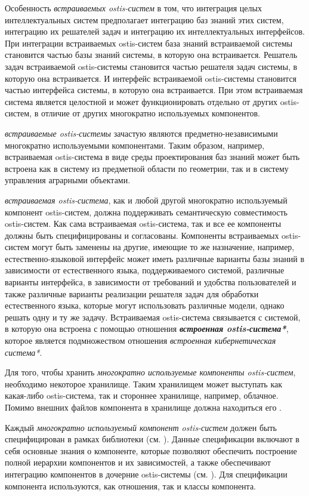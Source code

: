 Особенность \textit{встраиваемых ostis-систем} в том, что интеграция целых интеллектуальных систем предполагает интеграцию баз знаний этих систем, интеграцию их решателей задач и интеграцию их интеллектуальных интерфейсов. При интеграции встраиваемых ostis-систем база знаний встраиваемой системы становится частью базы знаний системы, в которую она встраивается. Решатель задач встраиваемой ostis-системы становится частью решателя задач системы, в которую она встраивается. И интерфейс встраиваемой ostis-системы становится частью интерфейса системы, в которую она встраивается. При этом встраиваемая система является целостной и может функционировать отдельно от других ostis-систем, в отличие от других многократно используемых компонентов.

\textit{встраиваемые ostis-системы} зачастую являются предметно-независимыми многократно используемыми компонентами. Таким образом, например, встраиваемая ostis-система в виде среды проектирования баз знаний может быть встроена как в систему из предметной области по геометрии, так и в систему управления аграрными объектами.

\textit{встраиваемая ostis-система}, как и любой другой многократно используемый компонент ostis-систем, должна поддерживать семантическую совместимость ostis-систем. Как сама встраиваемая ostis-система, так и все ее компоненты должны быть специфицированы и согласованы. Компоненты встраиваемых ostis-систем могут быть заменены на другие, имеющие то же назначение, например, естественно-языковой интерфейс может иметь различные варианты базы знаний в зависимости от естественного языка, поддерживаемого системой, различные варианты интерфейса, в зависимости от требований и удобства пользователей и также различные варианты реализации решателя задач для обработки естественного языка, которые могут использовать различные модели, однако решать одну и ту же задачу. Встраиваемая ostis-система связывается с системой, в которую она встроена с помощью отношения \textbf{\textit{встроенная ostis-система*}}, которое является подмножеством отношения \textit{встроенная кибернетическая система*}.

Для того, чтобы хранить \textit{многократно используемые компоненты ostis-систем}, необходимо некоторое хранилище. Таким хранилищем может выступать как какая-либо ostis-система, так и стороннее хранилище, например, облачное. Помимо внешних файлов компонента в хранилище должна находиться его .

Каждый \textit{многократно используемый компонент ostis-систем} должен быть специфицирован в рамках библиотеки (см. ). Данные спецификации включают в себя основные знания о компоненте, которые позволяют обеспечить построение полной иерархии компонентов и их зависимостей, а также обеспечивают  интеграцию компонентов в дочерние ostis-системы (см. ). Для спецификации компонента используются, как отношения, так и классы компонента.


